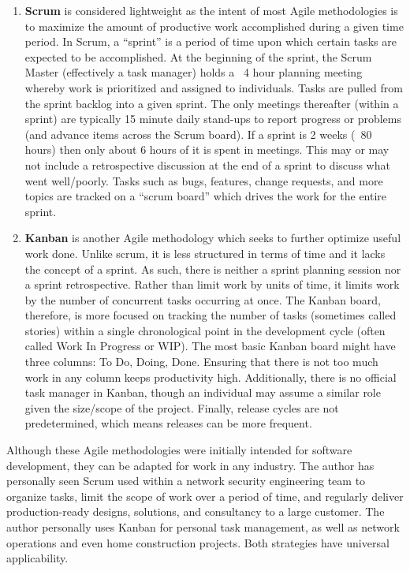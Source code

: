 \begin{enumerate}
  \item \textbf{Scrum} is considered lightweight as the intent of most Agile
  methodologies is to maximize the amount of productive work accomplished
  during a given time period. In Scrum, a ``sprint'' is a period of time upon
  which certain tasks are expected to be accomplished. At the beginning of the
  sprint, the Scrum Master (effectively a task manager) holds a ~4 hour
  planning meeting whereby work is prioritized and assigned to individuals.
  Tasks are pulled from the sprint backlog into a given sprint. The only
  meetings thereafter (within a sprint) are typically 15 minute daily
  stand-ups to report progress or problems (and advance items across the Scrum
  board). If a sprint is 2 weeks (~80 hours) then only about 6 hours of it is
  spent in meetings. This may or may not include a retrospective discussion at
  the end of a sprint to discuss what went well/poorly. Tasks such as bugs,
  features, change requests, and more topics are tracked on a ``scrum board''
  which drives the work for the entire sprint.
  \item \textbf{Kanban} is another Agile methodology which seeks to further
  optimize useful work done. Unlike scrum, it is less structured in terms of
  time and it lacks the concept of a sprint. As such, there is neither a
  sprint planning session nor a sprint retrospective. Rather than limit work
  by units of time, it limits work by the number of concurrent tasks occurring
  at once. The Kanban board, therefore, is more focused on tracking the number
  of tasks (sometimes called stories) within a single chronological point in
  the development cycle (often called Work In Progress or WIP). The most basic
  Kanban board might have three columns: To Do, Doing, Done. Ensuring that
  there is not too much work in any column keeps productivity high.
  Additionally, there is no official task manager in Kanban, though an
  individual may assume a similar role given the size/scope of the project.
  Finally, release cycles are not predetermined, which means releases can be
  more frequent.
\end{enumerate}

Although these Agile methodologies were initially intended for software
development, they can be adapted for work in any industry. The author has
personally seen Scrum used within a network security engineering team to
organize tasks, limit the scope of work over a period of time, and regularly
deliver production-ready designs, solutions, and consultancy to a large customer.
The author personally uses Kanban for personal task management, as well as
network operations and even home construction projects. Both strategies have
universal applicability.
